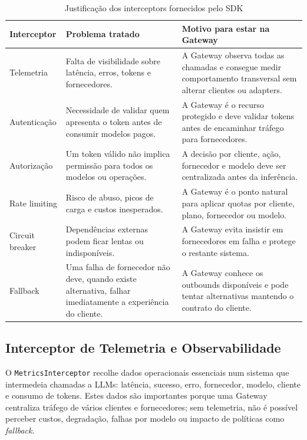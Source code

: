 \documentclass[11pt,a4paper]{report}
\begin{document}
    \begin{table}[H]
        \centering
        \footnotesize
        \renewcommand{\arraystretch}{1.25}
        \begin{tabularx}{\textwidth}{|>{\raggedright\arraybackslash}p{3.2cm}|Y|Y|}
            \hline
            \textbf{Interceptor} & \textbf{Problema tratado} & \textbf{Motivo para estar na Gateway} \\
            \hline
            Telemetria & Falta de visibilidade sobre latência, erros, tokens e fornecedores. & A Gateway observa todas as chamadas e consegue medir comportamento transversal sem alterar clientes ou adapters. \\
            \hline
            Autenticação & Necessidade de validar quem apresenta o token antes de consumir modelos pagos. & A Gateway é o recurso protegido e deve validar tokens antes de encaminhar tráfego para fornecedores. \\
            \hline
            Autorização & Um token válido não implica permissão para todos os modelos ou operações. & A decisão por cliente, ação, fornecedor e modelo deve ser centralizada antes da inferência. \\
            \hline
            Rate limiting & Risco de abuso, picos de carga e custos inesperados. & A Gateway é o ponto natural para aplicar quotas por cliente, plano, fornecedor ou modelo. \\
            \hline
            Circuit breaker & Dependências externas podem ficar lentas ou indisponíveis. & A Gateway evita insistir em fornecedores em falha e protege o restante sistema. \\
            \hline
            Fallback & Uma falha de fornecedor não deve, quando existe alternativa, falhar imediatamente a experiência do cliente. & A Gateway conhece os outbounds disponíveis e pode tentar alternativas mantendo o contrato do cliente. \\
            \hline
        \end{tabularx}
        \caption{Justificação dos interceptors fornecidos pelo SDK}
        \label{tab:interceptor-rationale}
    \end{table}

    \subsection{Interceptor de Telemetria e Observabilidade}
    O \texttt{MetricsInterceptor} recolhe dados operacionais essenciais num sistema que intermedeia chamadas a LLMs: latência, sucesso, erro, fornecedor, modelo, cliente e consumo de tokens. Estes dados são importantes porque uma Gateway centraliza tráfego de vários clientes e fornecedores; sem telemetria, não é possível perceber custos, degradação, falhas por modelo ou impacto de políticas como \textit{fallback}.
\end{document}
